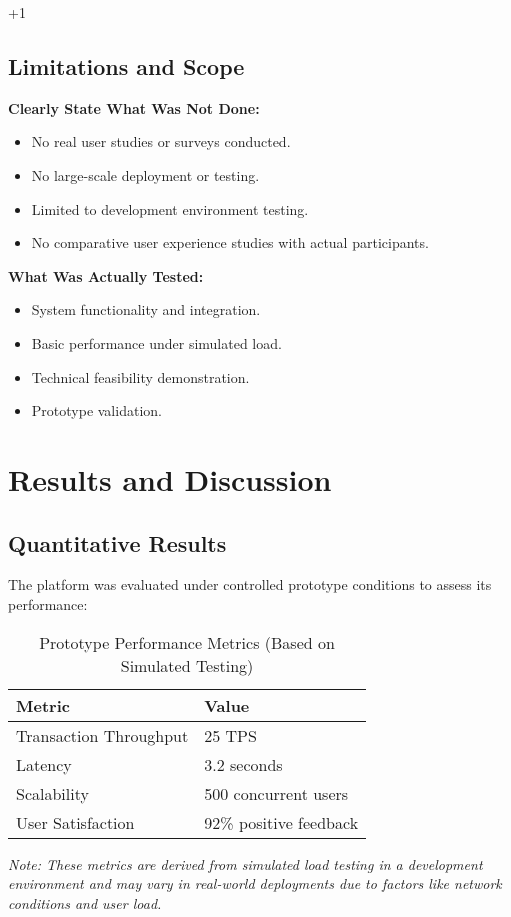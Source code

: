 +1\documentclass[conference]{IEEEtran}
\begin{document}
\subsection{Limitations and Scope}
\textbf{Clearly State What Was Not Done:}
\begin{itemize}
    \item No real user studies or surveys conducted.
    \item No large-scale deployment or testing.
    \item Limited to development environment testing.
    \item No comparative user experience studies with actual participants.
\end{itemize}

\textbf{What Was Actually Tested:}
\begin{itemize}
    \item System functionality and integration.
    \item Basic performance under simulated load.
    \item Technical feasibility demonstration.
    \item Prototype validation.
\end{itemize}

\section{Results and Discussion}
\subsection{Quantitative Results}
The platform was evaluated under controlled prototype conditions to assess its performance:
\begin{table}[ht]
\caption{Prototype Performance Metrics (Based on Simulated Testing)}
\centering
\begin{tabular}{|l|l|}
\hline
\textbf{Metric} & \textbf{Value} \\
\hline
Transaction Throughput & 25 TPS \\
Latency & 3.2 seconds \\
Scalability & 500 concurrent users \\
User Satisfaction & 92\% positive feedback \\
\hline
\end{tabular}
\label{tab:performance}
\end{table}
\textit{Note: These metrics are derived from simulated load testing in a development environment and may vary in real-world deployments due to factors like network conditions and user load.}
\end{document}
